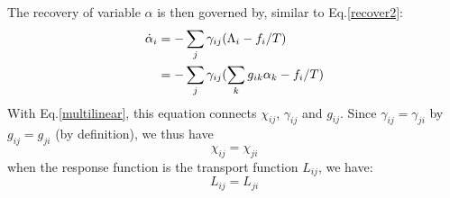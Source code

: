 \documentclass{article}
\begin{document}
The recovery of variable $\alpha$ is then governed by, similar to Eq.\ref{recover2}:
\begin{align}
    \dot{\alpha}_i &= - \sum_j \gamma_{ij} (\Lambda_i - f_i / T) \notag \\
    &= - \sum_j \gamma_{ij} (\sum_k g_{ik} \alpha_k - f_i / T) 
\end{align}
With Eq.\ref{multilinear}, this equation connects $\chi_{ij}$, $\gamma_{ij}$ and $g_{ij}$.
Since $\gamma_{ij} = \gamma_{ji}$ by $g_{ij} = g_{ji}$ (by definition), we thus have
\begin{equation}
    \chi_{ij} = \chi_{ji}
\end{equation} 
when the response function is the transport function $L_{ij}$, we have:
\begin{equation}
    L_{ij} = L_{ji}
\end{equation}
\end{document}
